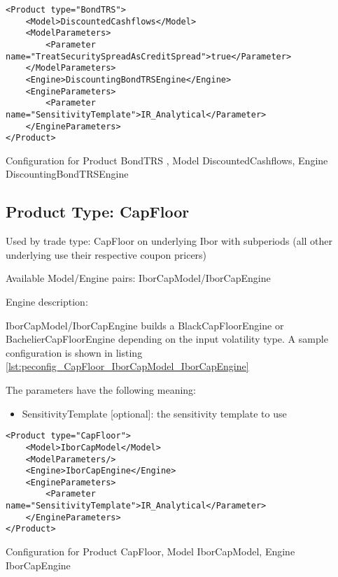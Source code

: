 \begin{longlisting}
\begin{verbatim}
<Product type="BondTRS">
    <Model>DiscountedCashflows</Model>
    <ModelParameters>
        <Parameter name="TreatSecuritySpreadAsCreditSpread">true</Parameter>
    </ModelParameters>
    <Engine>DiscountingBondTRSEngine</Engine>
    <EngineParameters>
        <Parameter name="SensitivityTemplate">IR_Analytical</Parameter>
    </EngineParameters>
</Product>
\end{verbatim}
\caption{Configuration for Product BondTRS , Model DiscountedCashflows, Engine DiscountingBondTRSEngine}
\label{lst:peconfig_BondTRS_DiscountedCashflows_DiscountedCashflows/DiscountingBondTRSEngine}
\end{longlisting}

\subsection{Product Type: CapFloor}

Used by trade type: CapFloor on underlying Ibor with subperiods (all other underlying use their respective coupon pricers)

Available Model/Engine pairs: IborCapModel/IborCapEngine

Engine description:

IborCapModel/IborCapEngine builds a BlackCapFloorEngine or BachelierCapFloorEngine depending on the input volatility
type. A sample configuration is shown in listing \ref{lst:peconfig_CapFloor_IborCapModel_IborCapEngine}

The parameters have the following meaning:

\begin{itemize}
\item SensitivityTemplate [optional]: the sensitivity template to use 
\end{itemize}

\begin{longlisting}
\begin{verbatim}
<Product type="CapFloor">
    <Model>IborCapModel</Model>
    <ModelParameters/>
    <Engine>IborCapEngine</Engine>
    <EngineParameters>
        <Parameter name="SensitivityTemplate">IR_Analytical</Parameter>
    </EngineParameters>
</Product>
\end{verbatim}
\caption{Configuration for Product CapFloor, Model IborCapModel, Engine IborCapEngine}
\label{lst:peconfig_CapFloor_IborCapModel_IborCapEngine}
\end{longlisting}


